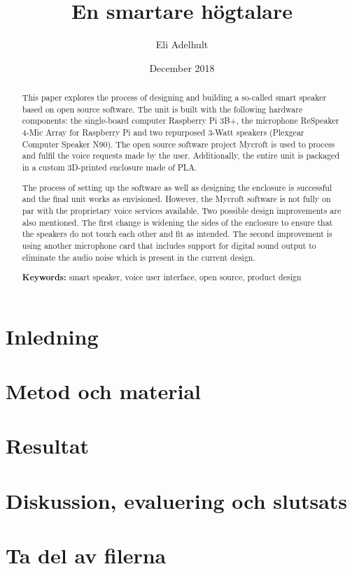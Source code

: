 \documentclass[11pt, a4paper, titlepage]{article}
\title{En smartare högtalare}
\author{Eli Adelhult}
\date{December 2018}
\begin{document}

\thispagestyle{empty}
\begin{abstract}
\noindent This paper explores the process of designing and building a so-called smart speaker based on open source software. The unit is built with the following hardware components: the single-board computer Raspberry Pi 3B+, the microphone ReSpeaker 4-Mic Array for Raspberry Pi and two repurposed 3-Watt speakers (Plexgear Computer Speaker N90). The open source software project Mycroft is used to process and fulfil the voice requests made by the user. Additionally, the entire unit is packaged in a custom 3D-printed enclosure made of PLA.

The process of setting up the software as well as designing the enclosure is successful and the final unit works as envisioned. However, the Mycroft software is not fully on par with the proprietary voice services available. Two possible design improvements are also mentioned. The first change is widening the sides of the enclosure to ensure that the speakers do not touch each other and fit as intended. The second improvement is using another microphone card that includes support for digital sound output to eliminate the audio noise which is present in the current design. 

\begin{flushleft}
		{\small {\bf Keywords:} smart speaker, voice user interface, open source, product design}
\end{flushleft}
\end{abstract}

\thispagestyle{empty}

\newpage
\tableofcontents
\thispagestyle{empty}
\newpage

\section{Inledning}


\section{Metod och material} \label{metod}


\newpage
\section{Resultat}


\section{Diskussion, evaluering och slutsats}



\section{Ta del av filerna}


\newpage
{} 
\printbibliography
\end{document}
